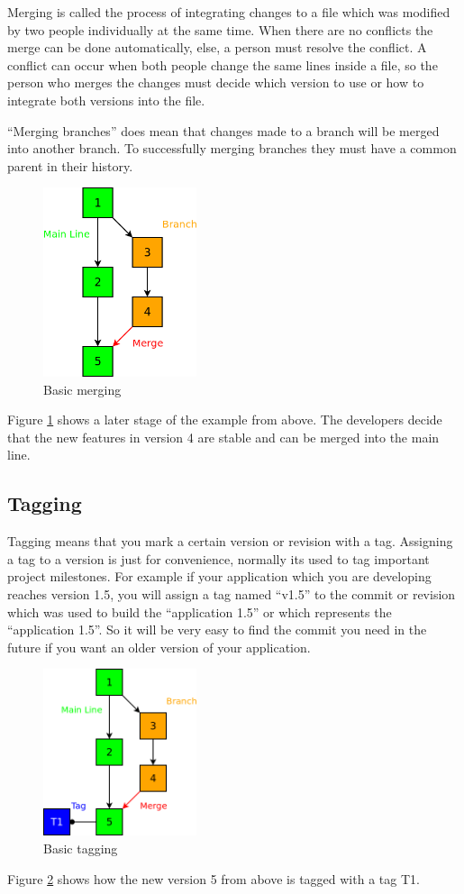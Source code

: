 Merging is called the process of integrating changes to a file which was modified by two people individually 
at the same time. When there are no conflicts the merge can be done automatically, else, a person must resolve 
the conflict. A conflict can occur when both people change the same lines inside a file, so the person who 
merges the changes must decide which version to use or how to integrate both versions into the file.

“Merging branches” does mean that changes made to a branch will be merged into another branch. 
To successfully merging branches they must have a common parent in their history.

\begin{figure}[ht]
  \centering
  \includegraphics[width=0.4\textwidth]{img/Gen_Merge}
  \caption{Basic merging}
  \label{fig:gen_merge} 
\end{figure}

Figure \ref{fig:gen_merge} shows a later stage of the example from above. The developers decide that 
the new features in version 4 are stable and can be merged into the main line.


\subsection{Tagging}

Tagging means that you mark a certain version or revision with a tag. 
Assigning a tag to a version is just for convenience, normally its used to tag important project milestones. 
For example if your application which you are developing reaches version 1.5, you will assign a tag named “v1.5” 
to the commit or revision which was used to build the “application 1.5” or which represents the “application 1.5”. 
So it will be very easy to find the commit you need in the future if you want an older version of your application.

\begin{figure}[ht]
  \centering
  \includegraphics[width=0.4\textwidth]{img/Gen_Tag}
  \caption{Basic tagging}
  \label{fig:gen_tag}
\end{figure}

Figure \ref{fig:gen_tag} shows how the new version 5 from above is tagged with a tag T1.
